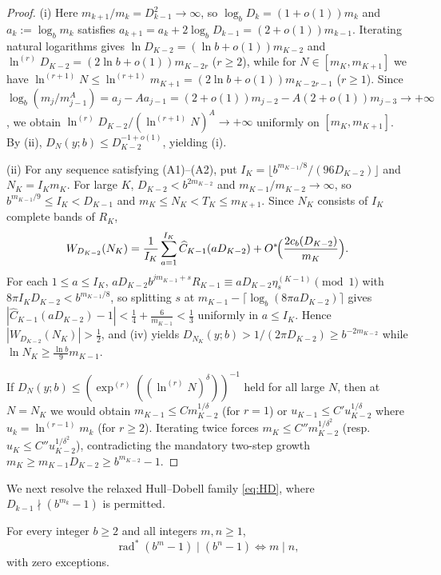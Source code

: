 \documentclass[11pt]{article}
\DeclareMathOperator{\rad}{rad}
\begin{document}
\begin{proof}
(i) Here $m_{k+1}/m_k=D_{k-1}^2\to\infty$, so $\log_b D_k=(1+o(1))m_k$ and $a_k:=\log_b m_k$ satisfies $a_{k+1}=a_k+2\log_b D_{k-1}=(2+o(1))m_{k-1}$. Iterating natural logarithms gives $\ln D_{K-2}=(\ln b+o(1))m_{K-2}$ and $\ln^{(r)}D_{K-2}=(2\ln b+o(1))m_{K-2r}$ ($r\ge2$), while for $N\in[m_K,m_{K+1}]$ we have $\ln^{(r+1)}N\le\ln^{(r+1)}m_{K+1}=(2\ln b+o(1))m_{K-2r-1}$ ($r\ge1$). Since $\log_b(m_j/m_{j-1}^A)=a_j-Aa_{j-1}=(2+o(1))m_{j-2}-A(2+o(1))m_{j-3}\to+\infty$, we obtain $\ln^{(r)}D_{K-2}/(\ln^{(r+1)}N)^A\to+\infty$ uniformly on $[m_K,m_{K+1}]$. By (ii), $D_N(y;b)\le D_{K-2}^{-1+o(1)}$, yielding (i).

(ii) For any sequence satisfying \textup{(A1)}--\textup{(A2)}, put $I_K=\lfloor b^{m_{K-1}/8}/(96 D_{K-2})\rfloor$ and $N_K=I_K m_K$. For large $K$, $D_{K-2}<b^{2m_{K-2}}$ and $m_{K-1}/m_{K-2}\to\infty$, so $b^{m_{K-1}/9}\le I_K<D_{K-1}$ and $m_K\le N_K<T_K\le m_{K+1}$. Since $N_K$ consists of $I_K$ complete bands of $R_K$,
\[
W_{D_{K-2}}(N_K)=\frac1{I_K}\sum_{a=1}^{I_K}\widehat C_{K-1}(aD_{K-2})+O^*\!\Bigl(\frac{2c_b(D_{K-2})}{m_K}\Bigr).
\]
For each $1\le a\le I_K$, $aD_{K-2}b^{jm_{K-1}+s}R_{K-1}\equiv aD_{K-2}\eta_s^{(K-1)}\pmod1$ with $8\pi I_K D_{K-2}<b^{m_{K-1}/8}$, so splitting $s$ at $m_{K-1}-\lceil\log_b(8\pi aD_{K-2})\rceil$ gives $|\widehat C_{K-1}(aD_{K-2})-1|<\frac14+\frac6{m_{K-1}}<\frac13$ uniformly in $a\le I_K$. Hence $|W_{D_{K-2}}(N_K)|>\frac12$, and (iv) yields $D_{N_K}(y;b)>1/(2\pi D_{K-2})\ge b^{-2m_{K-2}}$ while $\ln N_K\ge\frac{\ln b}{9}m_{K-1}$.

If $D_N(y;b)\le(\exp^{(r)}((\ln^{(r)}N)^\delta))^{-1}$ held for all large $N$, then at $N=N_K$ we would obtain $m_{K-1}\le C m_{K-2}^{1/\delta}$ (for $r=1$) or $u_{K-1}\le C' u_{K-2}^{1/\delta}$ where $u_k=\ln^{(r-1)}m_k$ (for $r\ge2$). Iterating twice forces $m_K\le C'' m_{K-2}^{1/\delta^2}$ (resp.\ $u_K\le C'' u_{K-2}^{1/\delta^2}$), contradicting the mandatory two-step growth $m_K\ge m_{K-1}D_{K-2}\ge b^{m_{K-2}}-1$.
\end{proof}

We next resolve the relaxed Hull--Dobell family \eqref{eq:HD}, where $D_{k-1}\nmid(b^{m_k}-1)$ is permitted.

\begin{lemma}\label{lem:BZ-rigidity}
For every integer $b\ge2$ and all integers $m,n\ge1$,
\[
\rad^*(b^m-1)\mid(b^n-1)\iff m\mid n,
\]
with zero exceptions.
\end{lemma}
\end{document}
